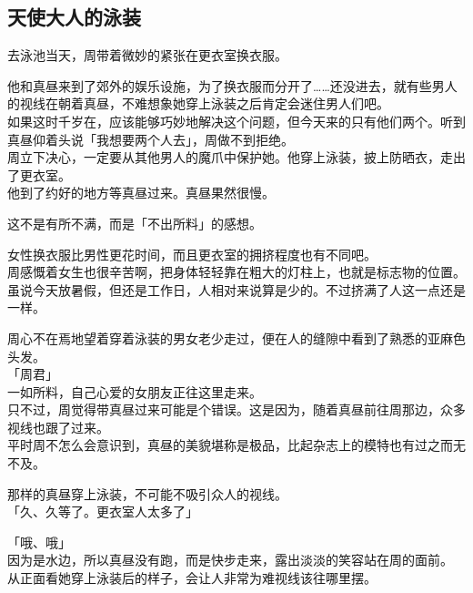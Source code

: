 \subsection{天使大人的泳装}

去泳池当天，周带着微妙的紧张在更衣室换衣服。

他和真昼来到了郊外的娱乐设施，为了换衣服而分开了……还没进去，就有些男人的视线在朝着真昼，不难想象她穿上泳装之后肯定会迷住男人们吧。\\

如果这时千岁在，应该能够巧妙地解决这个问题，但今天来的只有他们两个。听到真昼仰着头说「我想要两个人去」，周做不到拒绝。\\

周立下决心，一定要从其他男人的魔爪中保护她。他穿上泳装，披上防晒衣，走出了更衣室。\\

他到了约好的地方等真昼过来。真昼果然很慢。

这不是有所不满，而是「不出所料」的感想。

女性换衣服比男性更花时间，而且更衣室的拥挤程度也有不同吧。\\

周感慨着女生也很辛苦啊，把身体轻轻靠在粗大的灯柱上，也就是标志物的位置。\\

虽说今天放暑假，但还是工作日，人相对来说算是少的。不过挤满了人这一点还是一样。

周心不在焉地望着穿着泳装的男女老少走过，便在人的缝隙中看到了熟悉的亚麻色头发。\\

「周君」\\

一如所料，自己心爱的女朋友正往这里走来。\\

只不过，周觉得带真昼过来可能是个错误。这是因为，随着真昼前往周那边，众多视线也跟了过来。\\

平时周不怎么会意识到，真昼的美貌堪称是极品，比起杂志上的模特也有过之而无不及。

那样的真昼穿上泳装，不可能不吸引众人的视线。\\

「久、久等了。更衣室人太多了」

「哦、哦」\\

因为是水边，所以真昼没有跑，而是快步走来，露出淡淡的笑容站在周的面前。\\

从正面看她穿上泳装后的样子，会让人非常为难视线该往哪里摆。\\

